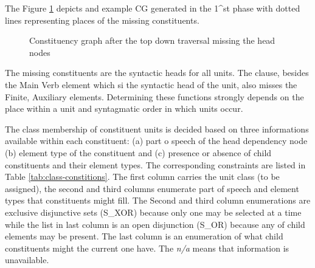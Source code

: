 The Figure \ref{fig:post-1st-phase-cg} depicts and example CG generated in the 1^{st} phase with dotted lines representing places of the missing constituents. 

\begin{figure}[!ht]
	\centering
	\caption{Constituency graph after the top down traversal missing the head nodes}
	\label{fig:post-1st-phase-cg}
\end{figure}

The missing constituents are the syntactic heads for all units. The clause, besides the Main Verb element which si the syntactic head of the unit, also misses the Finite, Auxiliary elements. Determining these functions strongly depends on the place within a unit and syntagmatic order in which units occur. %

The class membership of constituent units is decided based on three informations available within each constituent: (a) part o speech of the head dependency node (b) element type of the constituent and (c) presence or absence of child constituents and their element types. The corresponding constraints are listed in Table \ref{tab:class-constitions}. The first column carries the unit class (to be assigned), the second and third columns enumerate part of speech and element types that constituents might fill. The Second and third column enumerations are exclusive disjunctive sets (S_{XOR}) because only one may be selected at a time while the list in last column is an open disjunction (S_{OR}) because any of child elements may be present. The last column is an enumeration of what child constituents might the current one have. The \textit{n/a} means that information is unavailable. 


